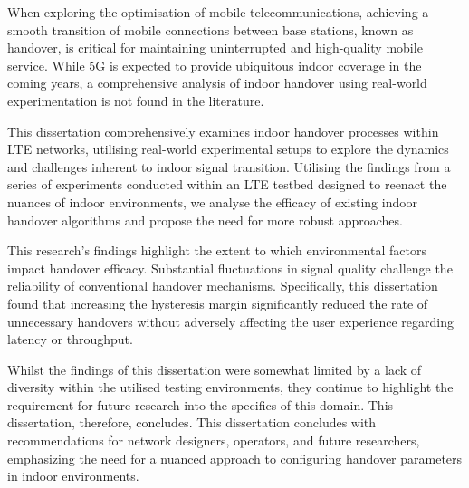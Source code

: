 When exploring the optimisation of mobile telecommunications, achieving a smooth transition of mobile connections between base stations, known as handover, is critical for maintaining uninterrupted and high-quality mobile service. While 5G is expected to provide ubiquitous indoor coverage in the coming years, a comprehensive analysis of indoor handover using real-world experimentation is not found in the literature. %

This dissertation comprehensively examines indoor handover processes within LTE networks, utilising real-world experimental setups to explore the dynamics and challenges inherent to indoor signal transition. Utilising the findings from a series of experiments conducted within an LTE testbed designed to reenact the nuances of indoor environments, we analyse the efficacy of existing indoor handover algorithms and propose the need for more robust approaches.

This research's findings highlight the extent to which environmental factors impact handover efficacy. Substantial fluctuations in signal quality challenge the reliability of conventional handover mechanisms. Specifically, this dissertation found that increasing the hysteresis margin significantly reduced the rate of unnecessary handovers without adversely affecting the user experience regarding latency or throughput. 

Whilst the findings of this dissertation were somewhat limited by a lack of diversity within the utilised testing environments, they continue to highlight the requirement for future research into the specifics of this domain. This dissertation, therefore, concludes. This dissertation concludes with recommendations for network designers, operators, and future researchers, emphasizing the need for a nuanced approach to configuring handover parameters in indoor environments. 